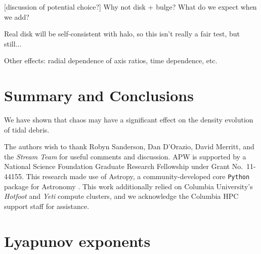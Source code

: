 \documentclass[letterpaper,12pt,preprint]{aastex}
\begin{document}
[discussion of potential choice?]
Why not disk + bulge? What do we expect when we add?

Real disk will be self-consistent with halo, so this isn't really a fair test, but still...

Other effects: radial dependence of axis ratios, time dependence, etc.

\section{Summary and Conclusions}\label{sec:conclusions}

We have shown that chaos may have a significant effect on the density evolution of tidal debris.

\acknowledgements
The authors wish to thank Robyn Sanderson, Dan D'Orazio, David Merritt, and the \emph{Stream Team} for useful comments and discussion.
APW is supported by a National Science Foundation Graduate Research Fellowship under Grant No.\ 11-44155. 
This research made use of Astropy, a community-developed core \texttt{Python} package for Astronomy \citep{astropy13}.
This work additionally relied on Columbia University's \emph{Hotfoot} and \emph{Yeti} compute clusters, and we acknowledge the Columbia HPC support staff for assistance.




\appendix
\section{Lyapunov exponents} \label{sec:lyapapdx}
\end{document}
